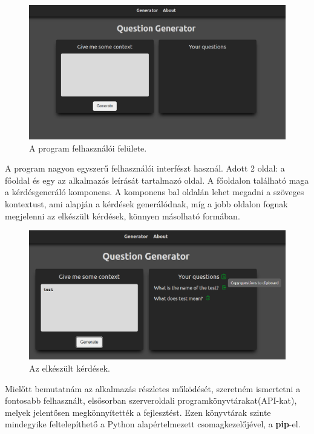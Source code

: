
\begin{figure}[h]
\centering
\includegraphics[scale=0.5]{images/app_ui.png}
\caption{A program felhasználói felülete.}
\label{fig:app_ui}
\end{figure}

A program nagyon egyszerű felhasználói interfészt használ. Adott 2 oldal: a főoldal és egy az alkalmazás leírását tartalmazó oldal. A főoldalon található maga a kérdésgeneráló komponens. A komponens bal oldalán lehet megadni a szöveges kontextust, ami alapján a kérdések generálódnak, míg a jobb oldalon fognak megjelenni az elkészült kérdések, könnyen másolható formában.

\begin{figure}[h]
\centering
\includegraphics[scale=0.5]{images/app_ui_2.png}
\caption{Az elkészült kérdések.}
\label{fig:app_ui_2}
\end{figure}


Mielőtt bemutatnám az alkalmazás részletes működését, szeretném ismertetni a fontosabb felhasznált, elsősorban szerveroldali programkönyvtárakat(API-kat), melyek jelentősen megkönnyítették a fejlesztést. Ezen könyvtárak szinte mindegyike feltelepíthető a Python alapértelmezett csomagkezelőjével, a \textbf{pip}-el.

